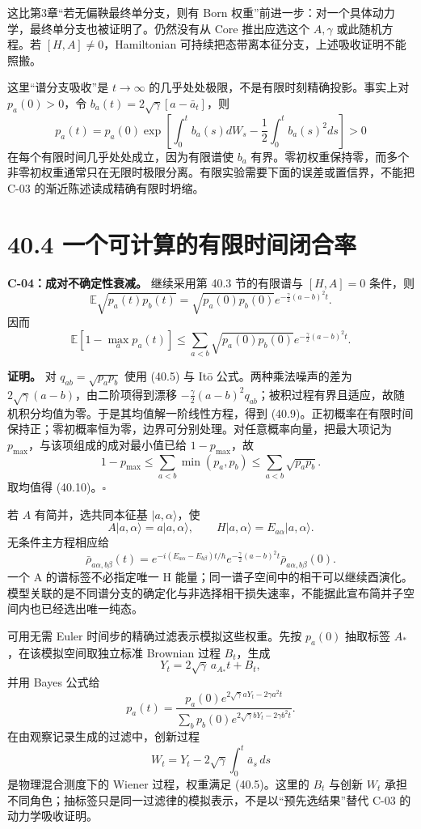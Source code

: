 \documentclass[
  11pt,
  oneside]{book}
\begin{document}
这比第3章``若无偏鞅最终单分支，则有 Born
权重''前进一步：对一个具体动力学，最终单分支也被证明了。仍然没有从 Core
推出应选这个 \(A,\gamma\) 或此随机方程。若 \([H,A]\ne0\)，Hamiltonian
可持续把态带离本征分支，上述吸收证明不能照搬。

这里``谱分支吸收''是 \(t\to\infty\)
的几乎处处极限，不是有限时刻精确投影。事实上对 \(p_a(0)>0\)，令
\(b_a(t)=2\sqrt\gamma[a-\bar a_t]\)，则 \[
p_a(t)=p_a(0)\exp\left[
\int_0^t b_a(s)dW_s-\frac12\int_0^t b_a(s)^2ds\right]>0
\] 在每个有限时间几乎处处成立，因为有限谱使 \(b_a\)
有界。零初权重保持零，而多个非零初权重通常只在无限时极限分离。有限实验需要下面的误差或置信界，不能把
C-03 的渐近陈述读成精确有限时坍缩。

\section{40.4 一个可计算的有限时间闭合率}

\protect\hypertarget{c-04}{}{}

\textbf{C-04：成对不确定性衰减。} 继续采用第 40.3 节的有限谱与
\([H,A]=0\) 条件，则 \[
\mathbb E\sqrt{p_a(t)p_b(t)}
=\sqrt{p_a(0)p_b(0)}
 e^{-\frac\gamma2(a-b)^2t}.
\tag{40.9}
\] 因而 \[
\mathbb E[1-\max_a p_a(t)]
\le\sum_{a<b}\sqrt{p_a(0)p_b(0)}
 e^{-\frac\gamma2(a-b)^2t}.
\tag{40.10}
\]

\textbf{证明。} 对 \(q_{ab}=\sqrt{p_ap_b}\) 使用 (40.5) 与 Itō
公式。两种乘法噪声的差为 \(2\sqrt\gamma(a-b)\)，由二阶项得到漂移
\(-\frac\gamma2(a-b)^2q_{ab}\)；被积过程有界且适应，故随机积分均值为零。于是其均值解一阶线性方程，得到
(40.9)。正初概率在有限时间保持正；零初概率恒为零，边界可分别处理。对任意概率向量，把最大项记为
\(p_{\max}\)，与该项组成的成对最小值已给 \(1-p_{\max}\)，故 \[
1-p_{\max}\le\sum_{a<b}\min(p_a,p_b)
\le\sum_{a<b}\sqrt{p_ap_b}.
\] 取均值得 (40.10)。\(\square\)

若 \(A\) 有简并，选共同本征基 \(|a,\alpha\rangle\)，使 \[
A|a,\alpha\rangle=a|a,\alpha\rangle,
\qquad H|a,\alpha\rangle=E_{a\alpha}|a,\alpha\rangle.
\] 无条件主方程相应给 \[
\bar\rho_{a\alpha,b\beta}(t)=
 e^{-i(E_{a\alpha}-E_{b\beta})t/\hbar}
 e^{-\frac\gamma2(a-b)^2t}
\bar\rho_{a\alpha,b\beta}(0).
\] 一个 A 的谱标签不必指定唯一 H
能量；同一谱子空间中的相干可以继续酉演化。模型关联的是不同谱分支的确定化与非选择相干损失速率，不能据此宣布简并子空间内也已经选出唯一纯态。

可用无需 Euler 时间步的精确过滤表示模拟这些权重。先按 \(p_a(0)\)
抽取标签 \(A_*\)，在该模拟空间取独立标准 Brownian 过程 \(B_t\)，生成 \[
Y_t=2\sqrt\gamma\,a_{A_*}t+B_t,
\] 并用 Bayes 公式给 \[
p_a(t)=
\frac{p_a(0)e^{2\sqrt\gamma aY_t-2\gamma a^2t}}
{\sum_b p_b(0)e^{2\sqrt\gamma bY_t-2\gamma b^2t}}.
\tag{40.11}
\] 在由观察记录生成的过滤中，创新过程 \[
W_t=Y_t-2\sqrt\gamma\int_0^t\bar a_s\,ds
\] 是物理混合测度下的 Wiener 过程，权重满足 (40.5)。这里的 \(B_t\)
与创新 \(W_t\)
承担不同角色；抽标签只是同一过滤律的模拟表示，不是以``预先选结果''替代
C-03 的动力学吸收证明。
\end{document}
